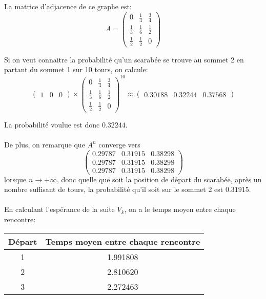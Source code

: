     La matrice d'adjacence de ce graphe est:
      \[A = \left(\begin{array}{ccc}
        0 & \frac 1 4 & \frac 3 4 \\
        \frac 1 3 & \frac 1 6 & \frac 1 2 \\
        \frac 1 2 & \frac 1 2 & 0
      \end{array}\right)\]

    Si on veut connaitre la probabilité qu'un scarabée se trouve au sommet 2 en
    partant du sommet 1 sur 10 tours, on calcule:
      \[
        \left(\begin{array}{ccc}
          1 & 0 & 0
        \end{array}\right)
        \times
        \left(\begin{array}{ccc}
          0 & \frac 1 4 & \frac 3 4 \\
          \frac 1 3 & \frac 1 6 & \frac 1 2 \\
          \frac 1 2 & \frac 1 2 & 0
        \end{array}\right)^{10}
        \approx
        \left(\begin{array}{ccc}
          0.30188 & 0.32244 & 0.37568
        \end{array}\right)
      \]

    La probabilité voulue est donc $0.32244$.

    \paragraph{}
    De plus, on remarque que $A^n$ converge vers
      \[
        \left(\begin{array}{ccc}
          0.29787 & 0.31915 & 0.38298 \\
          0.29787 & 0.31915 & 0.38298 \\
          0.29787 & 0.31915 & 0.38298
        \end{array}\right)
      \]
    lorsque $n \to +\infty$, donc quelle que soit la position de départ du
    scarabée, après un nombre suffisant de tours, la probabilité qu'il soit sur
    le sommet 2 est $0.31915$.

    \paragraph{}
    En calculant l'espérance de la suite $V_k$, on a le temps moyen entre chaque
    rencontre:

    \begin{center}
      \begin{tabular}{|c|c|}
        \hline
        Départ & Temps moyen entre chaque rencontre \\\hline
        1      & 1.991808 \\\hline
        2      & 2.810620 \\\hline
        3      & 2.272463 \\\hline
      \end{tabular}
    \end{center}


